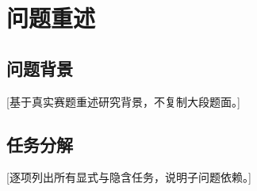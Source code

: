\section{问题重述}
\subsection{问题背景}
[基于真实赛题重述研究背景，不复制大段题面。]
\subsection{任务分解}
[逐项列出所有显式与隐含任务，说明子问题依赖。]

